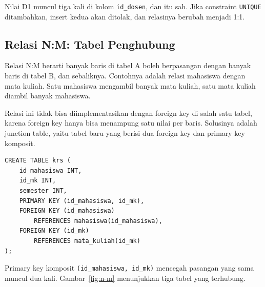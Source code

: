 \documentclass[11pt,a4paper]{article}
\begin{document}
Nilai D1 muncul tiga kali di kolom \texttt{id\_dosen}, dan itu sah. Jika constraint \texttt{UNIQUE} ditambahkan, insert kedua akan ditolak, dan relasinya berubah menjadi 1:1.

\subsection{Relasi N:M: Tabel Penghubung}

Relasi N:M berarti banyak baris di tabel A boleh berpasangan dengan banyak baris di tabel B, dan sebaliknya. Contohnya adalah relasi mahasiswa dengan mata kuliah. Satu mahasiswa mengambil banyak mata kuliah, satu mata kuliah diambil banyak mahasiswa.

Relasi ini tidak bisa diimplementasikan dengan foreign key di salah satu tabel, karena foreign key hanya bisa menampung satu nilai per baris. Solusinya adalah junction table, yaitu tabel baru yang berisi dua foreign key dan primary key komposit.

\begin{lstlisting}[style=code]
CREATE TABLE krs (
    id_mahasiswa INT,
    id_mk INT,
    semester INT,
    PRIMARY KEY (id_mahasiswa, id_mk),
    FOREIGN KEY (id_mahasiswa)
        REFERENCES mahasiswa(id_mahasiswa),
    FOREIGN KEY (id_mk)
        REFERENCES mata_kuliah(id_mk)
);
\end{lstlisting}

Primary key komposit \texttt{(id\_mahasiswa, id\_mk)} mencegah pasangan yang sama muncul dua kali. Gambar~\ref{fig:n-m} menunjukkan tiga tabel yang terhubung.
\end{document}
